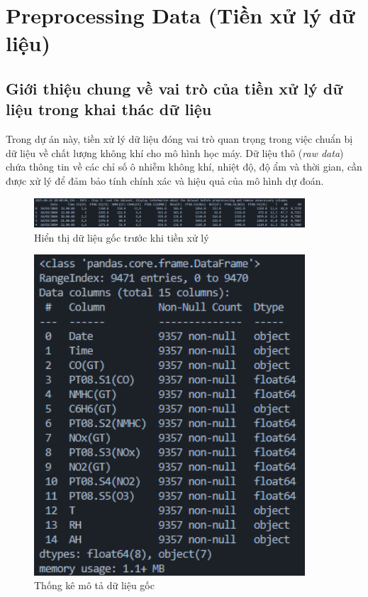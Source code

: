 \section{Preprocessing Data (Tiền xử lý dữ liệu)}

\subsection{Giới thiệu chung về vai trò của tiền xử lý dữ liệu trong khai thác dữ liệu}

\hspace{0.5cm}Trong dự án này, tiền xử lý dữ liệu đóng vai trò quan trọng trong việc chuẩn bị dữ liệu về chất lượng không khí cho mô hình học máy. Dữ liệu thô (\textit{raw data}) chứa thông tin về các chỉ số ô nhiễm không khí, nhiệt độ, độ ẩm và thời gian, cần được xử lý để đảm bảo tính chính xác và hiệu quả của mô hình dự đoán.

\begin{figure}[h]
    \centering
    \includegraphics[width=0.9\textwidth]{images/raw_data_preview.png}
    \caption{Hiển thị dữ liệu gốc trước khi tiền xử lý}
    \label{fig:raw_data_preview}
\end{figure}

\begin{figure}[h]
    \centering
    \includegraphics[width=0.9\textwidth]{images/raw_data_statistics.png}
    \caption{Thống kê mô tả dữ liệu gốc}
    \label{fig:raw_data_statistics}
\end{figure}


